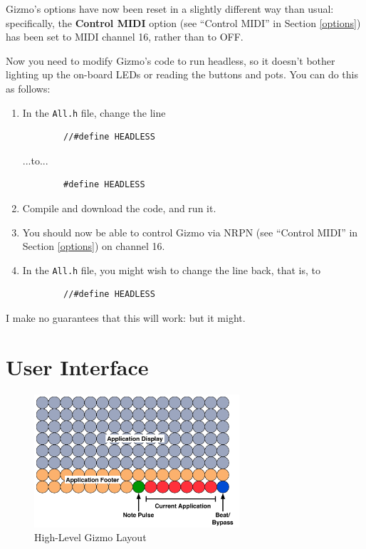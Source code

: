 \documentclass{article}
\begin{document}
Gizmo's options have now been reset in a slightly different way than usual: specifically, the {\bf Control MIDI} option (see ``Control MIDI'' in Section \ref{options}) has been set to MIDI channel 16, rather than to OFF.

Now you need to modify Gizmo's code to run headless, so it doesn't bother lighting up the on-board LEDs or reading the buttons and pots.   You can do this as follows:

\begin{enumerate}
\item In the \texttt{All.h} file, change the line 
\begin{verbatim}
        //#define HEADLESS
\end{verbatim}
...to...
\begin{verbatim}
        #define HEADLESS
\end{verbatim}
\item Compile and download the code, and run it.
\item You should now be able to control Gizmo via NRPN (see ``Control MIDI'' in Section \ref{options}) on channel 16.
\item In the \texttt{All.h} file, you might wish to change the line back, that is, to 
\begin{verbatim}
        //#define HEADLESS
\end{verbatim}

\end{enumerate}

I make no guarantees that this will work: but it might.

\section{User Interface}

\begin{figure}
\vspace{-1.5em}\includegraphics[width=3in]{OverallLayout.pdf}
\vspace{-2em}\caption{\small High-Level Gizmo Layout}
\label{HighLevelGizmoLayout}
\end{figure}
\end{document}
